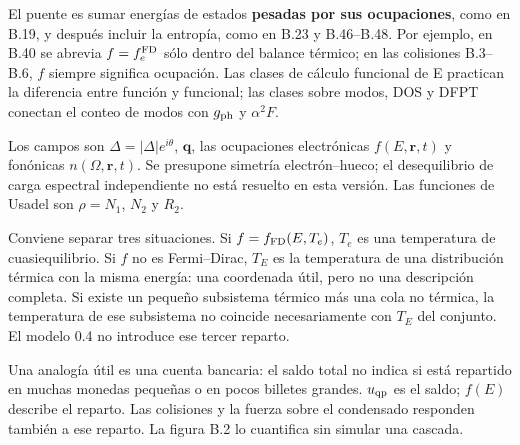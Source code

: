\documentclass[
  spanish,
  10pt,
  a4paper,
]{article}
\begin{document}
El puente es sumar energías de estados \textbf{pesadas por sus
ocupaciones}, como en B.19, y después incluir la entropía, como en B.23
y B.46--B.48. Por ejemplo, en B.40 se abrevia \(f=f_e^{\rm FD}\) sólo
dentro del balance térmico; en las colisiones B.3--B.6, \(f\) siempre
significa ocupación. Las clases de cálculo funcional de E practican la
diferencia entre función y funcional; las clases sobre modos, DOS y DFPT
conectan el conteo de modos con \(g_{\rm ph}\) y \(\alpha^2F\).

Los campos son \(\Delta=|\Delta| e^{i\theta}\), \(\mathbf q\), las
ocupaciones electrónicas \(f(E,\mathbf r,t)\) y fonónicas
\(n(\Omega,\mathbf r,t)\). Se presupone simetría electrón--hueco; el
desequilibrio de carga espectral independiente no está resuelto en esta
versión. Las funciones de Usadel son \(\rho=N_1\), \(N_2\) y \(R_2\).

Conviene separar tres situaciones. Si \(f=f_{\rm FD}(E,T_e)\), \(T_e\)
es una temperatura de cuasiequilibrio. Si \(f\) no es Fermi--Dirac,
\(T_E\) es la temperatura de una distribución térmica con la misma
energía: una coordenada útil, pero no una descripción completa. Si
existe un pequeño subsistema térmico más una cola no térmica, la
temperatura de ese subsistema no coincide necesariamente con \(T_E\) del
conjunto. El modelo 0.4 no introduce ese tercer reparto.

Una analogía útil es una cuenta bancaria: el saldo total no indica si
está repartido en muchas monedas pequeñas o en pocos billetes grandes.
\(u_{\rm qp}\) es el saldo; \(f(E)\) describe el reparto. Las colisiones
y la fuerza sobre el condensado responden también a ese reparto. La
figura B.2 lo cuantifica sin simular una cascada.
\end{document}
